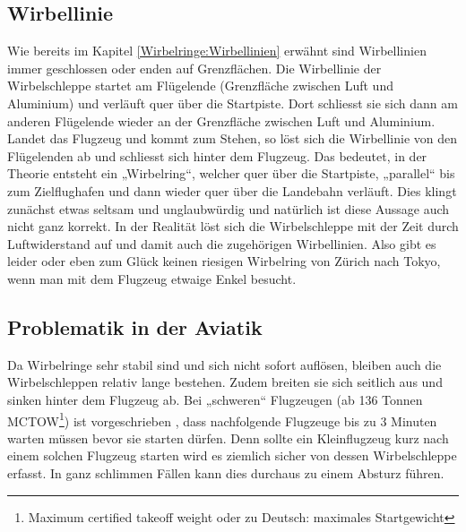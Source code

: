 \subsection{Wirbellinie}
Wie bereits im Kapitel \ref{Wirbelringe:Wirbellinien} erwähnt sind Wirbellinien immer geschlossen oder enden auf Grenzflächen.
Die Wirbellinie der Wirbelschleppe startet am Flügelende (Grenzfläche zwischen Luft und Aluminium) und verläuft quer über die Startpiste.
Dort schliesst sie sich dann am anderen Flügelende wieder an der Grenzfläche zwischen Luft und Aluminium.
Landet das Flugzeug und kommt zum Stehen, so löst sich die Wirbellinie von den Flügelenden ab und schliesst sich hinter dem Flugzeug.
Das bedeutet, in der Theorie entsteht ein „Wirbelring“, welcher quer über die Startpiste, „parallel“ bis zum Zielflughafen und dann wieder quer über die Landebahn verläuft.
Dies klingt zunächst etwas seltsam und unglaubwürdig und natürlich ist diese Aussage auch nicht ganz korrekt.
In der Realität löst sich die Wirbelschleppe mit der Zeit durch Luftwiderstand auf und damit auch die zugehörigen Wirbellinien.
Also gibt es leider oder eben zum Glück keinen riesigen Wirbelring von Zürich nach Tokyo, wenn man mit dem Flugzeug etwaige Enkel besucht.



\subsection{Problematik in der Aviatik}
Da Wirbelringe sehr stabil sind und sich nicht sofort auflösen, bleiben auch die Wirbelschleppen relativ lange bestehen.
Zudem breiten sie sich seitlich aus und sinken hinter dem Flugzeug ab.
Bei „schweren“ Flugzeugen (ab 136 Tonnen MCTOW\footnote{Maximum certified takeoff weight oder zu Deutsch: maximales Startgewicht}) ist vorgeschrieben \cite{Wirbelringe:WakeTurbulence}, dass nachfolgende Flugzeuge bis zu 3 Minuten warten müssen bevor sie starten dürfen.
Denn sollte ein Kleinflugzeug kurz nach einem solchen Flugzeug starten wird es ziemlich sicher von dessen Wirbelschleppe erfasst.
In ganz schlimmen Fällen kann dies durchaus zu einem Absturz führen.

